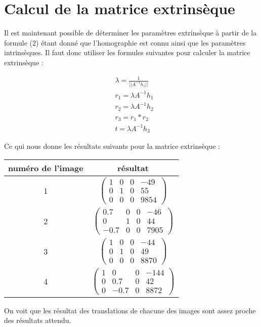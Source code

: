 \documentclass[a4paper,10pt]{article}
\begin{document}
\section{Calcul de la matrice extrinsèque}
Il est maintenant possible de déterminer les paramètres extrinsèque à partir de la formule (2)
étant donné que l'homographie est connu ainsi que les paramètres intrinsèques. Il faut donc utiliser
les formules suivantes pour calculer la matrice extrinsèque : 

\begin{align}
 &\lambda = \frac{1}{||A^{-1}h_1||}\\
 &r_1=\lambda A^{-1}h_1\\
 &r_2=\lambda A^{-1}h_2\\
 &r_3=r_1*r_2\\
 &t=\lambda A^{-1}h_3
\end{align}

Ce qui nous donne les résultats suivants pour la matrice extrinsèque :\\ 

\begin{center}
\begin{tabular}{|c|c|}
 \hline
 numéro de l'image & résultat\\
 \hline
 1 & $\begin{pmatrix} 1 & 0 & 0 & -49\\0 & 1 & 0 & 55\\ 0 & 0 & 0 & 9854\end{pmatrix}$\\
 \hline
 2 & $\begin{pmatrix} 0.7 & 0 & 0 & -46\\0 & 1 & 0 & 44\\ -0.7 & 0 & 0 & 7905\end{pmatrix}$\\
 \hline
 3 & $\begin{pmatrix} 1 & 0 & 0 & -44\\0 & 1 & 0 & 49\\ 0 & 0 & 0 & 8870\end{pmatrix}$\\
 \hline
 4 & $\begin{pmatrix} 1 & 0 & 0 & -144\\0 & 0.7 & 0 & 42\\ 0 & -0.7 & 0 & 8872\end{pmatrix}$\\
 \hline
\end{tabular}
\end{center}
On voit que les résultat des translations de chacune des images sont assez proche des résultats
attendu. 
\end{document}
